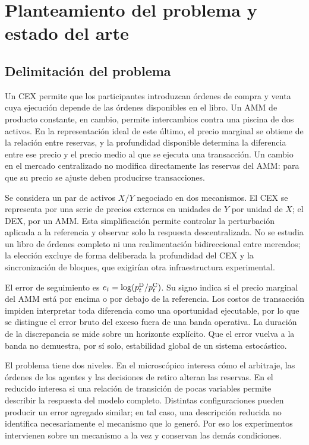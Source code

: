 \chapter{Planteamiento del problema y estado del arte}
\label{cap:problema}

\section{Delimitación del problema}

Un CEX permite que los participantes introduzcan órdenes de compra y venta cuya ejecución depende de las órdenes disponibles en el libro. Un AMM de producto constante, en cambio, permite intercambios contra una piscina de dos activos. En la representación ideal de este último, el precio marginal se obtiene de la relación entre reservas, y la profundidad disponible determina la diferencia entre ese precio y el precio medio al que se ejecuta una transacción. Un cambio en el mercado centralizado no modifica directamente las reservas del AMM: para que su precio se ajuste deben producirse transacciones.

Se considera un par de activos $X/Y$ negociado en dos mecanismos. El CEX se representa por una serie de precios externos en unidades de $Y$ por unidad de $X$; el DEX, por un AMM. Esta simplificación permite controlar la perturbación aplicada a la referencia y observar solo la respuesta descentralizada. No se estudia un libro de órdenes completo ni una realimentación bidireccional entre mercados; la elección excluye de forma deliberada la profundidad del CEX y la sincronización de bloques, que exigirían otra infraestructura experimental.

El error de seguimiento es $e_t=\log(p^{\mathrm{D}}_t/p^{\mathrm{C}}_t)$. Su signo indica si el precio marginal del AMM está por encima o por debajo de la referencia. Los costos de transacción impiden interpretar toda diferencia como una oportunidad ejecutable, por lo que se distingue el error bruto del exceso fuera de una banda operativa. La duración de la discrepancia se mide sobre un horizonte explícito. Que el error vuelva a la banda no demuestra, por sí solo, estabilidad global de un sistema estocástico.

El problema tiene dos niveles. En el microscópico interesa cómo el arbitraje, las órdenes de los agentes y las decisiones de retiro alteran las reservas. En el reducido interesa si una relación de transición de pocas variables permite describir la respuesta del modelo completo. Distintas configuraciones pueden producir un error agregado similar; en tal caso, una descripción reducida no identifica necesariamente el mecanismo que lo generó. Por eso los experimentos intervienen sobre un mecanismo a la vez y conservan las demás condiciones.

